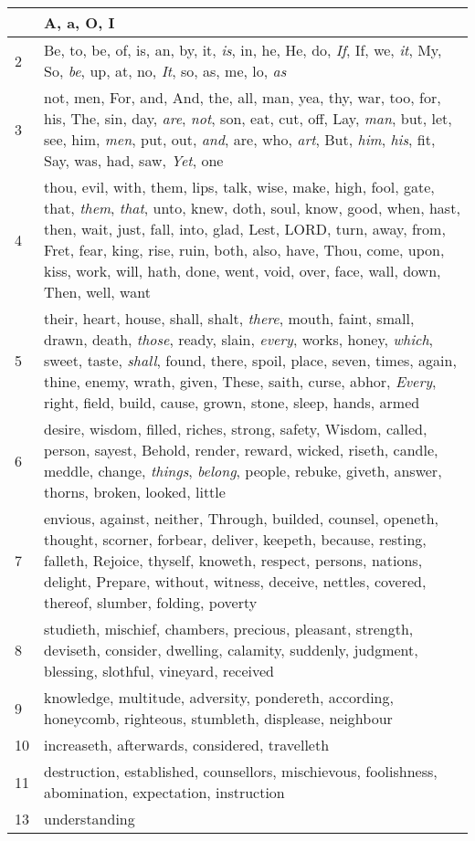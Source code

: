 \begin{center}
\begin{longtable}{l|p{3.75in}}
\hline \hline 
\endlastfoot 
1 & A, a, O, I\\ \hline 
2 & Be, to, be, of, is, an, by, it, \emph{is}, in, he, He, do, \emph{If}, If, we, \emph{it}, My, So, \emph{be}, up, at, no, \emph{It}, so, as, me, lo, \emph{as}\\ \hline 
3 & not, men, For, and, And, the, all, man, yea, thy, war, too, for, his, The, sin, day, \emph{are}, \emph{not}, son, eat, cut, off, Lay, \emph{man}, but, let, see, him, \emph{men}, put, out, \emph{and}, are, who, \emph{art}, But, \emph{him}, \emph{his}, fit, Say, was, had, saw, \emph{Yet}, one\\ \hline 
4 & thou, evil, with, them, lips, talk, wise, make, high, fool, gate, that, \emph{them}, \emph{that}, unto, knew, doth, soul, know, good, when, hast, then, wait, just, fall, into, glad, Lest, LORD, turn, away, from, Fret, fear, king, rise, ruin, both, also, have, Thou, come, upon, kiss, work, will, hath, done, went, void, over, face, wall, down, Then, well, want\\ \hline 
5 & their, heart, house, shall, shalt, \emph{there}, mouth, faint, small, drawn, death, \emph{those}, ready, slain, \emph{every}, works, honey, \emph{which}, sweet, taste, \emph{shall}, found, there, spoil, place, seven, times, again, thine, enemy, wrath, given, These, saith, curse, abhor, \emph{Every}, right, field, build, cause, grown, stone, sleep, hands, armed\\ \hline 
6 & desire, wisdom, filled, riches, strong, safety, Wisdom, called, person, sayest, Behold, render, reward, wicked, riseth, candle, meddle, change, \emph{things}, \emph{belong}, people, rebuke, giveth, answer, thorns, broken, looked, little\\ \hline 
7 & envious, against, neither, Through, builded, counsel, openeth, thought, scorner, forbear, deliver, keepeth, because, resting, falleth, Rejoice, thyself, knoweth, respect, persons, nations, delight, Prepare, without, witness, deceive, nettles, covered, thereof, slumber, folding, poverty\\ \hline 
8 & studieth, mischief, chambers, precious, pleasant, strength, deviseth, consider, dwelling, calamity, suddenly, judgment, blessing, slothful, vineyard, received\\ \hline 
9 & knowledge, multitude, adversity, pondereth, according, honeycomb, righteous, stumbleth, displease, neighbour\\ \hline 
10 & increaseth, afterwards, considered, travelleth\\ \hline 
11 & destruction, established, counsellors, mischievous, foolishness, abomination, expectation, instruction\\ \hline 
13 & understanding\\ \hline 
\end{longtable} 
\end{center} 




 
